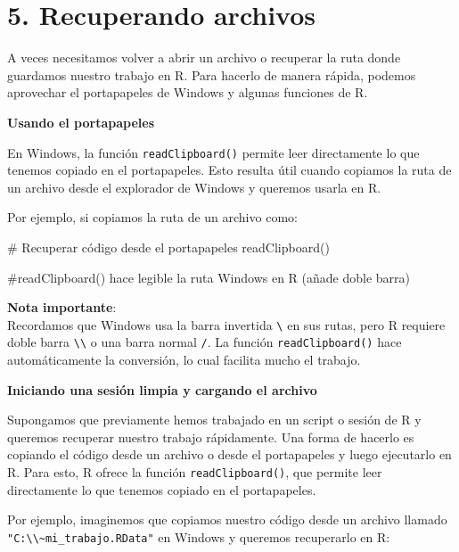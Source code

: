 \documentclass[
  letterpaper,
]{scrbook}
\newenvironment{Shaded}{\begin{snugshade}}{\end{snugshade}}
\newcommand{\CommentTok}[1]{\textcolor[rgb]{0.37,0.37,0.37}{#1}}
\newcommand{\FunctionTok}[1]{\textcolor[rgb]{0.28,0.35,0.67}{#1}}
\newcommand{\NormalTok}[1]{\textcolor[rgb]{0.00,0.23,0.31}{#1}}
\begin{document}
\hypertarget{recuperando-archivos}{%
\section{5. Recuperando archivos}\label{recuperando-archivos}}

A veces necesitamos volver a abrir un archivo o recuperar la ruta donde
guardamos nuestro trabajo en R. Para hacerlo de manera rápida, podemos
aprovechar el portapapeles de Windows y algunas funciones de R.

\textbf{Usando el portapapeles}

En Windows, la función \texttt{readClipboard()} permite leer
directamente lo que tenemos copiado en el portapapeles. Esto resulta
útil cuando copiamos la ruta de un archivo desde el explorador de
Windows y queremos usarla en R.

Por ejemplo, si copiamos la ruta de un archivo como:

\begin{Shaded}
\begin{Highlighting}[]
\CommentTok{\# Recuperar código desde el portapapeles}
\FunctionTok{readClipboard}\NormalTok{()}

\CommentTok{\#readClipboard() hace legible la ruta Windows en R (añade doble barra)}
\end{Highlighting}
\end{Shaded}

\textbf{Nota importante}:\\

Recordamos que Windows usa la barra invertida \texttt{\textbackslash{}}
en sus rutas, pero R requiere doble barra
\texttt{\textbackslash{}\textbackslash{}} o una barra normal \texttt{/}.
La función \texttt{readClipboard()} hace automáticamente la conversión,
lo cual facilita mucho el trabajo.

\textbf{Iniciando una sesión limpia y cargando el archivo}

Supongamos que previamente hemos trabajado en un script o sesión de R y
queremos recuperar nuestro trabajo rápidamente. Una forma de hacerlo es
copiando el código desde un archivo o desde el portapapeles y luego
ejecutarlo en R. Para esto, R ofrece la función
\texttt{readClipboard()}, que permite leer directamente lo que tenemos
copiado en el portapapeles.

Por ejemplo, imaginemos que copiamos nuestro código desde un archivo
llamado
\texttt{"C:\textbackslash{}\textbackslash{}\textasciitilde{}mi\_trabajo.RData"}
en Windows y queremos recuperarlo en R:
\end{document}
